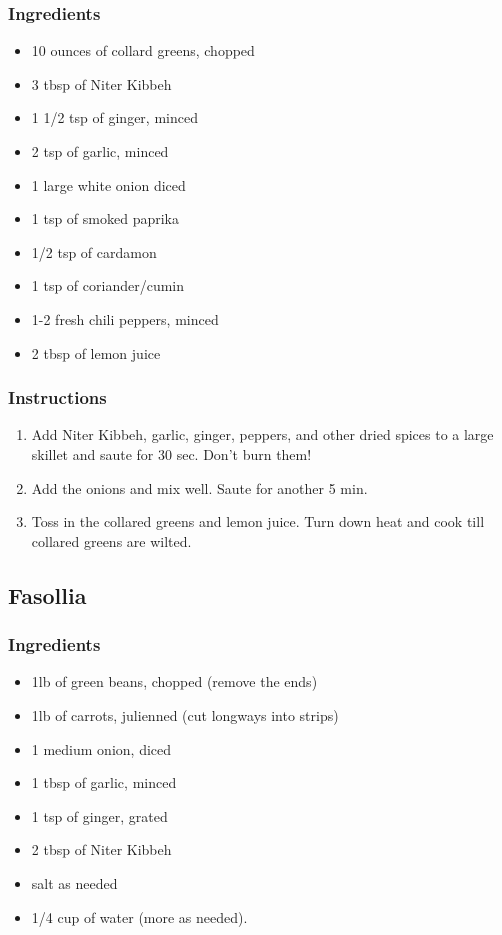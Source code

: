 \documentclass[11pt]{article}
\begin{document}
\subsubsection*{Ingredients}
\label{sec:org32db564}
\begin{itemize}
\item 10 ounces of collard greens, chopped
\item 3 tbsp of Niter Kibbeh
\item 1 1/2 tsp of ginger, minced
\item 2 tsp of garlic, minced
\item 1 large white onion diced
\item 1 tsp of smoked paprika
\item 1/2 tsp of cardamon
\item 1 tsp of coriander/cumin
\item 1-2 fresh chili peppers, minced
\item 2 tbsp of lemon juice
\end{itemize}
\subsubsection*{Instructions}
\label{sec:orge44868a}
\begin{enumerate}
\item Add Niter Kibbeh, garlic, ginger, peppers, and other dried spices to a large skillet and saute for 30 sec. Don't burn them!
\item Add the onions and mix well. Saute for another 5 min.
\item Toss in the collared greens and lemon juice. Turn down heat and cook till collared greens are wilted.
\end{enumerate}
\subsection{Fasollia}
\label{sec:org0406c47}
\subsubsection*{Ingredients}
\label{sec:org8e88004}
\begin{itemize}
\item 1lb of green beans, chopped (remove the ends)
\item 1lb of carrots, julienned (cut longways into strips)
\item 1 medium onion, diced
\item 1 tbsp of garlic, minced
\item 1 tsp of ginger, grated
\item 2 tbsp of Niter Kibbeh
\item salt as needed
\item 1/4 cup of water (more as needed).
\end{itemize}
\end{document}

